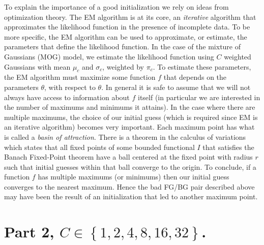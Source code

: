 \documentclass[10pt]{article}
\begin{document}
To explain the importance of a good initialization we rely on ideas from optimization theory. The EM algorithm is at its core, an \textit{iterative} algorithm that approximates the likelihood function in the presence of incomplete data. To be more specific, the EM algorithm can be used to approximate, or estimate, the parameters that define the likelihood function. In the case of the mixture of Gaussians (MOG) model, we estimate the likelihood function using $C$ weighted Gaussians with mean $\mu_c$ and $\sigma_c$, weighted by $\pi_c$. To estimate these parameters, the EM algorithm must maximize some function $f$ that depends on the parameters $\theta$, with respect to $\theta$. In general it is safe to assume that we will not always have access to information about $f$ itself (in particular we are interested in the number of maximums and minimums it attains). In the case where there are multiple maximums, the choice of our initial guess (which is required since EM is an iterative algorithm) becomes very important. Each maximum point has what is called a \textit{basin of attraction}. There is a theorem in the calculus of variations which states that all fixed points of some bounded functional $I$ that satisfies the Banach Fixed-Point theorem have a ball centered at the fixed point with radius $r$ such that initial guesses within that ball converge to the origin. To conclude, if a function $f$ has multiple maximums (or minimums) then our initial guess converges to the nearest maximum. Hence the bad FG/BG pair described above may have been the result of an initialization that led to another maximum point. 
\section{Part 2, $C \in \left\{ 1,2,4,8,16,32 \right\}$.}
\end{document}
